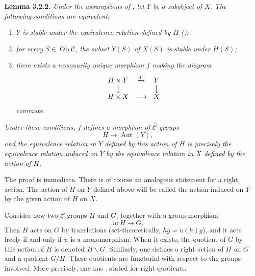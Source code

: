 \medskip
\noindent{}\textbf{Lemma 3.2.2.}
\textit{Under the assumptions of , let \(Y\) be a subobject of \(X\).
The following conditions are equivalent:}
\begin{enumerate}
  \item[(i)] \textit{\(Y\) is stable under the equivalence relation defined
  by \(H\) ();}
  \item[(ii)] \textit{for every \(S\in\operatorname{Ob}\mathscr C\), the
  subset \(Y(S)\) of \(X(S)\) is stable under \(H(S)\);}
  \item[(iii)] \textit{there exists a necessarily unique morphism \(f\)
  making the diagram}
  \[
    \begin{array}{ccc}
      H\times Y & \xrightarrow{f} & Y\\
      \big\downarrow && \big\downarrow\\
      H\times X & \longrightarrow & X
    \end{array}
  \]
  \textit{commute.}
\end{enumerate}
\textit{Under these conditions, \(f\) defines a morphism of
\(\widehat{\mathscr C}\)-groups}
\[
  H\longrightarrow\operatorname{Aut}(Y),
\]
\textit{and the equivalence relation in \(Y\) defined by this action of
\(H\) is precisely the equivalence relation induced on \(Y\) by the
equivalence relation in \(X\) defined by the action of \(H\).}

The proof is immediate. There is of course an analogous statement for a
right action. The action of \(H\) on \(Y\) defined above will be called the
action induced on \(Y\) by the given action of \(H\) on \(X\).

Consider now two \(\mathscr C\)-groups \(H\) and \(G\), together with a
group morphism
\[
  u:H\longrightarrow G.
\]
Then \(H\) acts on \(G\) by translations (set-theoretically,
\(hg=u(h)g\)), and it acts freely if and only if \(u\) is a monomorphism.
When it exists, the quotient of \(G\) by this action of \(H\) is denoted
\(H\backslash G\). Similarly, one defines a right action of \(H\) on \(G\)
and a quotient \(G/H\). These quotients are functorial with respect to the
groups involved. More precisely, one has , stated for
right quotients.

